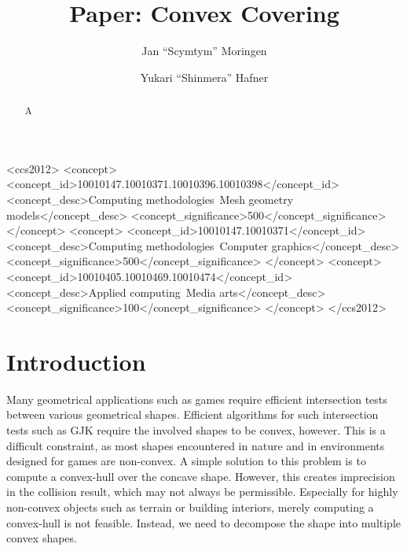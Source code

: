 \documentclass[format=sigconf]{acmart}
\begin{document}
\title{Paper: Convex Covering}

\author{Jan ``Scymtym'' Moringen}
\author{Yukari ``Shinmera'' Hafner}

\begin{CCSXML}
  <ccs2012>
  <concept>
  <concept_id>10010147.10010371.10010396.10010398</concept_id>
  <concept_desc>Computing methodologies~Mesh geometry models</concept_desc>
  <concept_significance>500</concept_significance>
  </concept>
  <concept>
  <concept_id>10010147.10010371</concept_id>
  <concept_desc>Computing methodologies~Computer graphics</concept_desc>
  <concept_significance>500</concept_significance>
  </concept>
  <concept>
  <concept_id>10010405.10010469.10010474</concept_id>
  <concept_desc>Applied computing~Media arts</concept_desc>
  <concept_significance>100</concept_significance>
  </concept>
  </ccs2012>
\end{CCSXML}


\begin{abstract}
  A
\end{abstract}


\maketitle

\def\abovecaptionskip{1pt}
\def\listingautorefname{Listing}
\def\figureautorefname{Figure}

\section{Introduction}\label{introduction}
Many geometrical applications such as games require efficient intersection tests between various geometrical shapes. Efficient algorithms for such intersection tests such as GJK\cite{gilbert1988fast} require the involved shapes to be convex, however. This is a difficult constraint, as most shapes encountered in nature and in environments designed for games are non-convex. A simple solution to this problem is to compute a convex-hull over the concave shape. However, this creates imprecision in the collision result, which may not always be permissible. Especially for highly non-convex objects such as terrain or building interiors, merely computing a convex-hull is not feasible.
Instead, we need to decompose the shape into multiple convex shapes.
\end{document}
